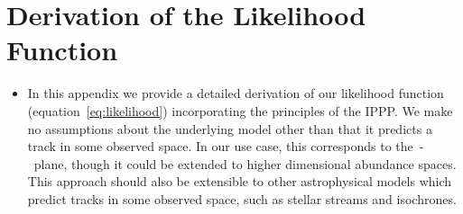 \documentclass[ms.tex]{subfiles}
\begin{document}
\section{Derivation of the Likelihood Function}
\label{sec:l_derivation}
\renewcommand\theequation{\thesection\arabic{equation}}
\renewcommand\thefigure{\thesection\arabic{figure}}
\setcounter{equation}{0}
\setcounter{figure}{0}

\begin{itemize}

	\item In this appendix we provide a detailed derivation of our likelihood
	function (equation~\ref{eq:likelihood}) incorporating the principles of the
	IPPP.
	We make no assumptions about the underlying model other than that it
	predicts a track in some observed space.
	In our use case, this corresponds to the~\afe-\feh~plane, though it could
	be extended to higher dimensional abundance spaces.
	This approach should also be extensible to other astrophysical models which
	predict tracks in some observed space, such as stellar streams and
	isochrones.


\end{itemize}
\end{document}
